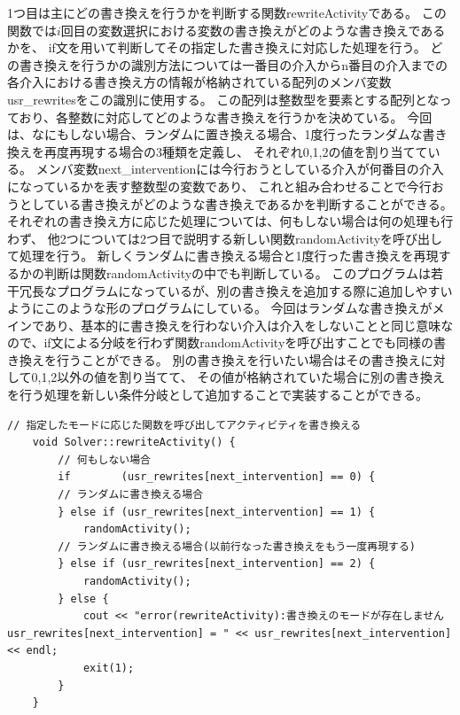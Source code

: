 1つ目は主にどの書き換えを行うかを判断する関数rewriteActivityである。
この関数では$i$回目の変数選択における変数の書き換えがどのような書き換えであるかを、
if文を用いて判断してその指定した書き換えに対応した処理を行う。
どの書き換えを行うかの識別方法については一番目の介入からn番目の介入までの各介入における書き換え方の情報が格納されている配列のメンバ変数usr\_rewritesをこの識別に使用する。
この配列は整数型を要素とする配列となっており、各整数に対応してどのような書き換えを行うかを決めている。
今回は、なにもしない場合、ランダムに置き換える場合、1度行ったランダムな書き換えを再度再現する場合の3種類を定義し、
それぞれ0,1,2の値を割り当てている。
メンバ変数next\_interventionには今行おうとしている介入が何番目の介入になっているかを表す整数型の変数であり、
これと組み合わせることで今行おうとしている書き換えがどのような書き換えであるかを判断することができる。
それぞれの書き換え方に応じた処理については、何もしない場合は何の処理も行わず、
他2つについては2つ目で説明する新しい関数randomActivityを呼び出して処理を行う。
新しくランダムに書き換える場合と1度行った書き換えを再現するかの判断は関数randomActivityの中でも判断している。
このプログラムは若干冗長なプログラムになっているが、別の書き換えを追加する際に追加しやすいようにこのような形のプログラムにしている。
今回はランダムな書き換えがメインであり、基本的に書き換えを行わない介入は介入をしないことと同じ意味なので、if文による分岐を行わず関数randomActivityを呼び出すことでも同様の書き換えを行うことができる。
別の書き換えを行いたい場合はその書き換えに対して0,1,2以外の値を割り当てて、
その値が格納されていた場合に別の書き換えを行う処理を新しい条件分岐として追加することで実装することができる。
\begin{lstlisting}[caption=関数rewriteActivity(core/Solver.cc)]
	// 指定したモードに応じた関数を呼び出してアクティビティを書き換える
	void Solver::rewriteActivity() {
    	// 何もしない場合
    	if        (usr_rewrites[next_intervention] == 0) {
		// ランダムに書き換える場合
    	} else if (usr_rewrites[next_intervention] == 1) {
    	    randomActivity();
		// ランダムに書き換える場合(以前行なった書き換えをもう一度再現する)
    	} else if (usr_rewrites[next_intervention] == 2) {
    	    randomActivity();
    	} else {
    	    cout << "error(rewriteActivity):書き換えのモードが存在しません usr_rewrites[next_intervention] = " << usr_rewrites[next_intervention] << endl;
    	    exit(1);
    	}
	}
\end{lstlisting}


